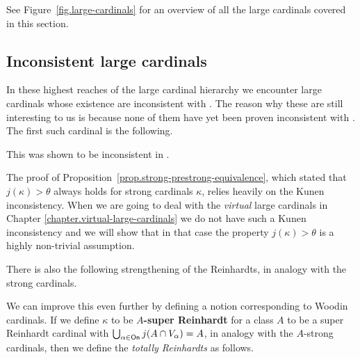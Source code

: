 \documentclass[../../main]{subfiles}
\begin{document}
See Figure~\ref{fig.large-cardinals} for an overview of all the large cardinals covered in this section.

\subsection{Inconsistent large cardinals}

In these highest reaches of the large cardinal hierarchy we encounter large cardinals whose existence are inconsistent with \zfc. The reason why these are still interesting to us is because none of them have yet been proven inconsistent with \zf. The first such cardinal is the following.


This was shown to be inconsistent in \cite{kunen-inconsistency}.


The proof of Proposition~\ref{prop.strong-prestrong-equivalence}, which stated that $j(\kappa)>\theta$ always holds for strong cardinals $\kappa$, relies heavily on the Kunen inconsistency. When we are going to deal with the \textit{virtual} large cardinals in Chapter \ref{chapter.virtual-large-cardinals} we do not have such a Kunen inconsistency and we will show that in that case the property $j(\kappa)>\theta$ is a highly non-trivial assumption.

\qquad There is also the following strengthening of the Reinhardts, in analogy with the strong cardinals.


We can improve this even further by defining a notion corresponding to Woodin cardinals. If we define $\kappa$ to be \textbf{$A$-super Reinhardt} for a class $A$ to be a super Reinhardt cardinal with $\bigcup_{\alpha\in\textsf{On}}j(A\cap V_\alpha)=A$, in analogy with the $A$-strong cardinals, then we define the \textit{totally Reinhardts} as follows.
\end{document}
